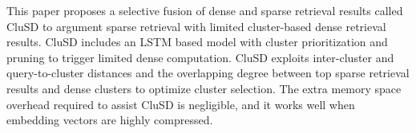 This paper proposes  a selective fusion of dense and sparse retrieval results 
called CluSD to argument  sparse retrieval with limited cluster-based dense retrieval results.
CluSD includes an LSTM based model with cluster prioritization and pruning to trigger limited dense computation. 
CluSD exploits inter-cluster and query-to-cluster distances and   the overlapping degree between top sparse retrieval results and dense clusters
to optimize cluster selection. 
The extra memory space overhead required to assist CluSD is negligible, and it  
works well when embedding vectors are highly compressed.












